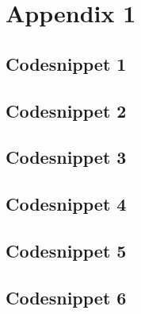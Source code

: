 \chapter{Appendix 1}
\section{Codesnippet 1}
	

\newpage
\section{Codesnippet 2}


\newpage
\section{Codesnippet 3}


\newpage
\section{Codesnippet 4}


\newpage
\section{Codesnippet 5}


\newpage
\section{Codesnippet 6}


